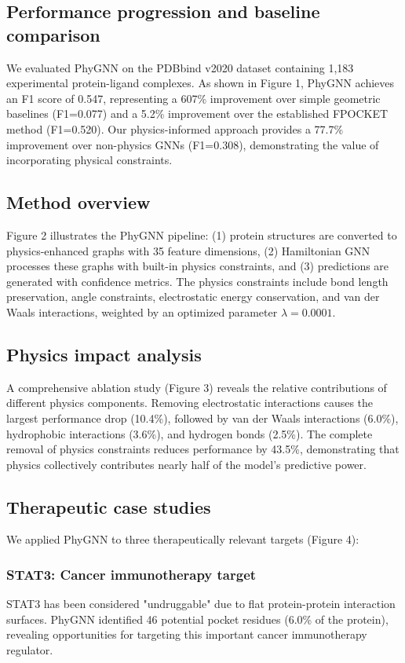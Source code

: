 \subsection*{Performance progression and baseline comparison}
We evaluated PhyGNN on the PDBbind v2020 dataset containing 1,183 experimental protein-ligand complexes. As shown in Figure 1, PhyGNN achieves an F1 score of 0.547, representing a 607\% improvement over simple geometric baselines (F1=0.077) and a 5.2\% improvement over the established FPOCKET method (F1=0.520). Our physics-informed approach provides a 77.7\% improvement over non-physics GNNs (F1=0.308), demonstrating the value of incorporating physical constraints.

\subsection*{Method overview}
Figure 2 illustrates the PhyGNN pipeline: (1) protein structures are converted to physics-enhanced graphs with 35 feature dimensions, (2) Hamiltonian GNN processes these graphs with built-in physics constraints, and (3) predictions are generated with confidence metrics. The physics constraints include bond length preservation, angle constraints, electrostatic energy conservation, and van der Waals interactions, weighted by an optimized parameter $\lambda = 0.0001$.

\subsection*{Physics impact analysis}
A comprehensive ablation study (Figure 3) reveals the relative contributions of different physics components. Removing electrostatic interactions causes the largest performance drop (10.4\%), followed by van der Waals interactions (6.0\%), hydrophobic interactions (3.6\%), and hydrogen bonds (2.5\%). The complete removal of physics constraints reduces performance by 43.5\%, demonstrating that physics collectively contributes nearly half of the model's predictive power.

\subsection*{Therapeutic case studies}
We applied PhyGNN to three therapeutically relevant targets (Figure 4):

\subsubsection*{STAT3: Cancer immunotherapy target}
STAT3 has been considered "undruggable" due to flat protein-protein interaction surfaces. PhyGNN identified 46 potential pocket residues (6.0\% of the protein), revealing opportunities for targeting this important cancer immunotherapy regulator.

